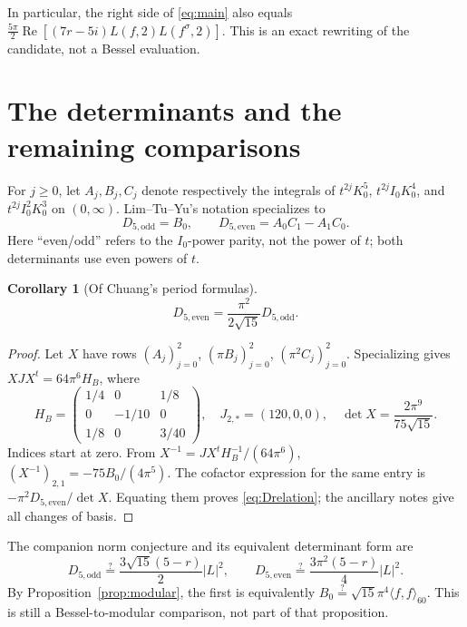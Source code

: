 \documentclass[11pt]{article}
\numberwithin{equation}{section}
\newtheorem{corollary}[theorem]{Corollary}
\theoremstyle{definition}
\theoremstyle{remark}
\theoremstyle{plain}
\newcommand{\Real}{\operatorname{Re}}
\newcommand{\De}{D_{5,\mathrm{even}}}
\newcommand{\Do}{D_{5,\mathrm{odd}}}
\begin{document}
In particular, the right side of \eqref{eq:main} also equals
$\frac{5\pi}{2}\Real[(7r-5i)L(f,2)L(f^\sigma,2)]$.
This is an exact rewriting of the candidate, not a Bessel evaluation.

\section{The determinants and the remaining comparisons}
For $j\ge0$, let $A_j,B_j,C_j$ denote respectively the integrals of
$t^{2j}K_0^5$, $t^{2j}I_0K_0^4$, and $t^{2j}I_0^2K_0^3$ on $(0,\infty)$.
Lim--Tu--Yu's notation \cite[eq.~(42)]{LTY} specializes to
\begin{equation}\label{eq:Ddef}
 \Do=B_0,\qquad \De=A_0C_1-A_1C_0.
\end{equation}
Here ``even/odd'' refers to the $I_0$-power parity, not the power of $t$;
both determinants use even powers of $t$.
\begin{corollary}[Of Chuang's period formulas]\label{cor:det}
\begin{equation}\label{eq:Drelation}
 \De=\frac{\pi^2}{2\sqrt{15}}\Do.
\end{equation}
\end{corollary}
\begin{proof}
Let $X$ have rows $(A_j)_{j=0}^2$, $(\pi B_j)_{j=0}^2$,
$(\pi^2C_j)_{j=0}^2$.
Specializing \cite[Propositions~13, 18, 24, 32 and Corollary~39]{Chu}
gives $XJX^t=64\pi^6H_B$, where
\[
 H_B=\begin{pmatrix}1/4&0&1/8\\0&-1/10&0\\1/8&0&3/40\end{pmatrix},
 \quad J_{2,*}=(120,0,0),\quad
 \det X=\frac{2\pi^9}{75\sqrt{15}}.
\]
Indices start at zero. From $X^{-1}=JX^tH_B^{-1}/(64\pi^6)$,
$(X^{-1})_{2,1}=-75B_0/(4\pi^5)$.
The cofactor expression for the same entry is $-\pi^2\De/\det X$.
Equating them proves \eqref{eq:Drelation}; the ancillary notes give
all changes of basis.
\end{proof}

The companion norm conjecture and its equivalent determinant form are
\begin{equation}\label{eq:Dnorm}
 \boxed{\Do\stackrel?=\frac{3\sqrt{15}(5-r)}2|L|^2,
 \qquad \De\stackrel?=\frac{3\pi^2(5-r)}4|L|^2.}
\end{equation}
By Proposition~\ref{prop:modular}, the first is equivalently
$B_0\stackrel?=\sqrt{15}\pi^4\langle f,f\rangle_{60}$.
This is still a Bessel-to-modular comparison, not part of that proposition.
\end{document}
